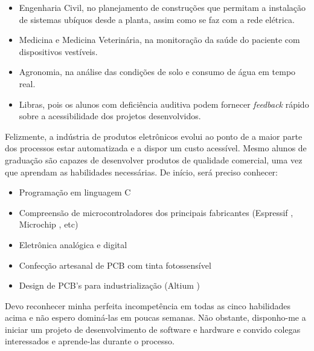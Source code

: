 \documentclass[12pt]{article}
\begin{document}
\begin{multicols}{2}
    \begin{itemize}
        \item Engenharia Civil, no planejamento de construções que permitam a instalação de sistemas ubíquos desde a planta, assim como se faz com a rede elétrica.
        \item Medicina e Medicina Veterinária, na monitoração da saúde do paciente com dispositivos vestíveis.
        \item Agronomia, na análise das condições de solo e consumo de água em tempo real.
        \item Libras, pois os alunos com deficiência auditiva podem fornecer \textit{feedback} rápido sobre a acessibilidade dos projetos desenvolvidos.
    \end{itemize}

    Felizmente, a indústria de produtos eletrônicos evolui ao ponto de a maior parte dos processos estar automatizada e a dispor um custo acessível. Mesmo alunos de graduação são capazes de desenvolver produtos de qualidade comercial, uma vez que aprendam as habilidades necessárias. De início, será preciso conhecer:
    
    \begin{itemize}
        \item Programação em linguagem C
        \item Compreensão de microcontroladores dos principais fabricantes (Espressif \cite{esp-devkits}, Microchip \cite{microchip-mcus}, etc)
        \item Eletrônica analógica e digital
        \item Confecção artesanal de PCB com tinta fotossensível
        \item Design de PCB's para industrialização (Altium \cite{altium-designer})
    \end{itemize}

    Devo reconhecer minha perfeita incompetência em todas as cinco habilidades acima e não espero dominá-las em poucas semanas. Não obstante, disponho-me a iniciar um projeto de desenvolvimento de software e hardware e convido colegas interessados e aprende-las durante o processo.
    
\end{multicols}


\end{document}
